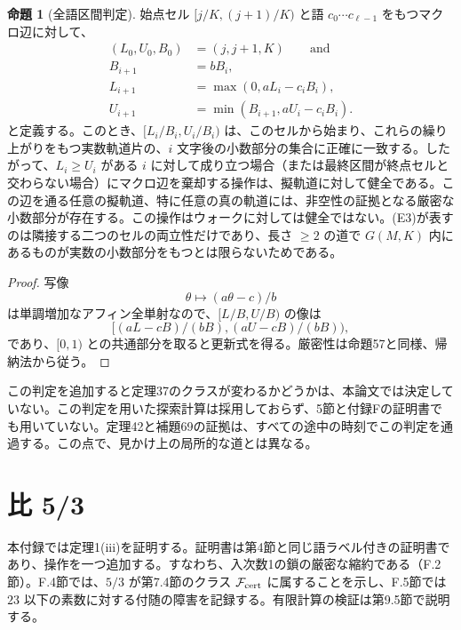 \documentclass[11pt,reqno]{amsart}
\theoremstyle{definition}
\newtheorem{proposition}[theorem]{命題}
\theoremstyle{definition}
\theoremstyle{remark}
\begin{document}
\begin{samepage}
\begin{proposition}[全語区間判定]\leavevmode\label{thm:73}
始点セル \([j/K,(j+1)/K)\) と語 \(c_0\cdots c_{\ell-1}\) をもつマクロ辺に対して、
\[
\begin{aligned}
(L_0,U_0,B_0)&=(j,j+1,K)\qquad\text{and}\\
B_{i+1}&=bB_i,\\
L_{i+1}&=\max(0,aL_i-c_iB_i),\\
U_{i+1}&=\min(B_{i+1},aU_i-c_iB_i).
\end{aligned}
\]
と定義する。このとき、\([L_i/B_i,U_i/B_i)\) は、このセルから始まり、これらの繰り上がりをもつ実数軌道片の、\(i\) 文字後の小数部分の集合に正確に一致する。したがって、\(L_i\ge U_i\) がある \(i\) に対して成り立つ場合（または最終区間が終点セルと交わらない場合）にマクロ辺を棄却する操作は、擬軌道に対して健全である。この辺を通る任意の擬軌道、特に任意の真の軌道には、非空性の証拠となる厳密な小数部分が存在する。この操作はウォークに対しては健全ではない。(E3)が表すのは隣接する二つのセルの両立性だけであり、長さ \(\ge2\) の道で \(G(M,K)\) 内にあるものが実数の小数部分をもつとは限らないためである。
\label{thm-end:73}
\end{proposition}
\end{samepage}

\begin{proof}\leavevmode\label{proof:73}
写像
\[
\theta\mapsto(a\theta-c)/b
\]
は単調増加なアフィン全単射なので、\([L/B,U/B)\) の像は
\[
[(aL-cB)/(bB),(aU-cB)/(bB)),
\]
であり、\([0,1)\) との共通部分を取ると更新式を得る。厳密性は命題57と同様、帰納法から従う。\qedhere
\end{proof}

この判定を追加すると定理37のクラスが変わるかどうかは、本論文では決定していない。この判定を用いた探索計算は採用しておらず、5節と付録Fの証明書でも用いていない。定理42と補題69の証拠は、すべての途中の時刻でこの判定を通過する。この点で、見かけ上の局所的な道とは異なる。

\section{比 5/3}\label{app:F}

本付録では定理1(iii)を証明する。証明書は第4節と同じ語ラベル付きの証明書であり、操作を一つ追加する。すなわち、入次数1の鎖の厳密な縮約である（F.2節）。F.4節では、\(5/3\) が第7.4節のクラス \(\mathcal F_{\rm cert}\) に属することを示し、F.5節では \(23\) 以下の素数に対する付随の障害を記録する。有限計算の検証は第9.5節で説明する。
\end{document}

